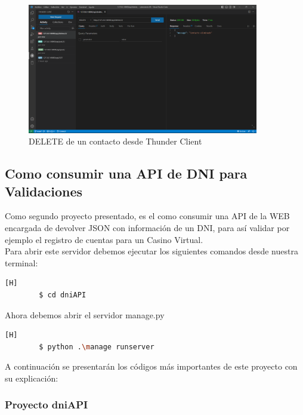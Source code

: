 \documentclass{article}
\begin{document}
        \begin{figure}[H]
            \centering
            \includegraphics[width=0.9\textwidth,keepaspectratio]{img/DjangoApiRest/delete.png}
            \caption{DELETE de un contacto desde Thunder Client}
            \label{fig:enter-label}
        \end{figure}

    \subsection{Como consumir una API de DNI para Validaciones}
    Como segundo proyecto presentado, es el como consumir una API de la WEB encargada de devolver JSON con información de un DNI, para así validar por ejemplo el registro de cuentas para un Casino Virtual.\\

    Para abrir este servidor debemos ejecutar los siguientes comandos desde nuestra terminal:
    
    \begin{lstlisting}[language=bash,caption={Ingresango a la carpeta dniAPI}][H]
		$ cd dniAPI
	\end{lstlisting}

        Ahora debemos abrir el servidor manage.py
        
        \begin{lstlisting}[language=bash,caption={Abriendo el servidor de este proyecto de consumir API DNI}][H]
		$ python .\manage runserver
	\end{lstlisting}
    
    
    A continuación se presentarán los códigos más importantes de este proyecto con su explicación:\\

    \subsubsection{Proyecto dniAPI}\\
\end{document}
